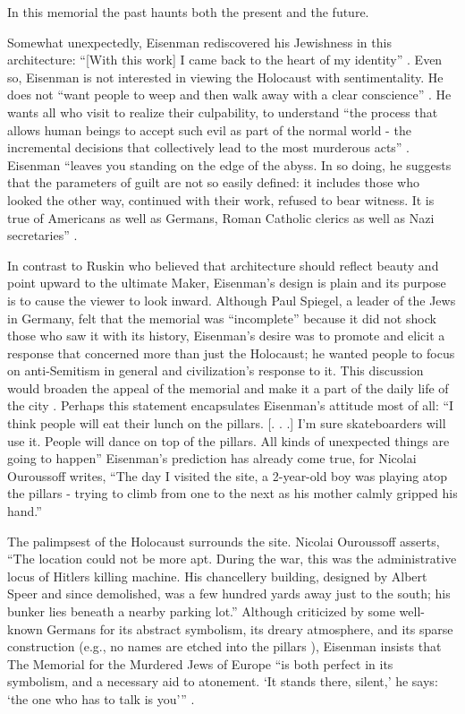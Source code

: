 In this memorial the past haunts both the present and the future.

Somewhat unexpectedly, Eisenman rediscovered his Jewishness in this
architecture: “[With this work] I came back to the heart of my
identity” \citep{quigley2005}.  Even so, Eisenman is not interested in
viewing the Holocaust with sentimentality.  He does not
``want people to weep and then walk
away with a clear conscience'' \citep{ouroussoff2005}.  He
wants all who visit to realize their culpability, to understand ``the
process that allows human beings to accept such evil as part of the
normal world - the incremental decisions that collectively lead to the
most murderous acts'' \citep{ouroussof2005}. Eisenman “leaves you standing on the edge of the
abyss.  In so doing, he suggests that the parameters of guilt are not
so easily defined: it includes those who looked the other way,
continued with their work, refused to bear witness.  It is true of
Americans as well as Germans, Roman Catholic clerics as well as Nazi
secretaries” \citep{ouroussof2005}. 

In contrast to Ruskin who believed that architecture should reflect
beauty and point upward to the ultimate Maker, Eisenman’s design is
plain and its purpose is to cause the viewer to look inward.  Although
Paul Spiegel, a leader of the Jews in Germany, felt that the memorial
was “incomplete” because it did not shock those who saw it with its
history, Eisenman’s desire was to promote and elicit a response that
concerned more than just the Holocaust; he wanted people to focus on
anti-Semitism in general and civilization’s response to it.  This
discussion would broaden the appeal of the memorial and make it a part
of the daily life of the city \citep{quigley2005}.  Perhaps this statement
encapsulates Eisenman’s attitude most of all:
“I think people will eat their lunch on
the pillars. [. . .] I’m sure skateboarders will use it.  People will
dance on top of the pillars.  All kinds of unexpected things are going
to happen” \citep{quigley2005}  Eisenman’s prediction has already come
true, for Nicolai Ouroussoff writes, “The day I visited the
site, a 2-year-old boy was playing atop the pillars - trying to climb
from one to the next as his mother calmly gripped his hand.” \citep{ouroussof2005}

The palimpsest of the Holocaust surrounds the site.  Nicolai
Ouroussoff asserts, “The location could not be more
apt.  During the war, this was the administrative locus of
Hitler{\textquotesingle}s killing machine.  His chancellery building,
designed by Albert Speer and since demolished, was a
few hundred yards away just to the south; his bunker lies beneath a
nearby parking lot.” \citep{ouroussof2005}  Although criticized by some well-known Germans
for its abstract symbolism, its dreary atmosphere, and its sparse
construction \citep{quigley2005} (e.g., no names are etched into the pillars
\citep{brunberg2012}), Eisenman insists that The Memorial for the Murdered Jews
of Europe “is both perfect in its symbolism, and a necessary aid to
atonement.  ‘It stands there, silent,’ he says: ‘the one who has to
talk is you’” \citep{quigley2005}.

